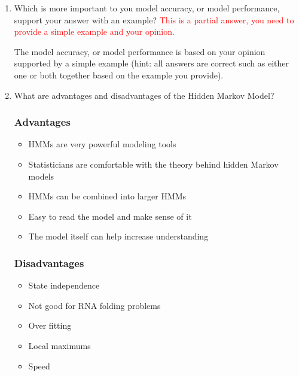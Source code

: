 \documentclass[12pt]{article}
\newenvironment{QandA}{\begin{enumerate}[label=\bfseries\arabic*.]\bfseries}
{\end{enumerate}}
\newenvironment{answered}{\par\normalfont\color{Sepia}}{}
\begin{document}
\begin{QandA}
    \item Which is more important to you \textemdash{} model accuracy, or model
    performance, support your answer with an example? \textcolor{red}{This is a
    partial answer, you need to provide a simple example and your
    opinion.}
    \begin{answered}
        The model accuracy, or model performance is based on your
        opinion supported by a simple example (hint: all answers are
        correct such as either one or both together based on the
        example you provide).
    \end{answered}

    \item What are advantages and disadvantages of the Hidden Markov Model?
    \begin{answered}
        \subsubsection*{Advantages}
        \begin{itemize}
            \item HMMs are very powerful modeling tools
            \item Statisticians are comfortable with the theory behind hidden Markov models
            \item HMMs can be combined into larger HMMs
            \item Easy to read the model and make sense of it
            \item The model itself can help increase understanding
        \end{itemize}
        \subsubsection*{Disadvantages}
        \begin{itemize}
            \item State independence
            \item Not good for RNA folding problems
            \item Over fitting
            \item Local maximums
            \item Speed
        \end{itemize}
    \end{answered}
\end{QandA}
\end{document}
